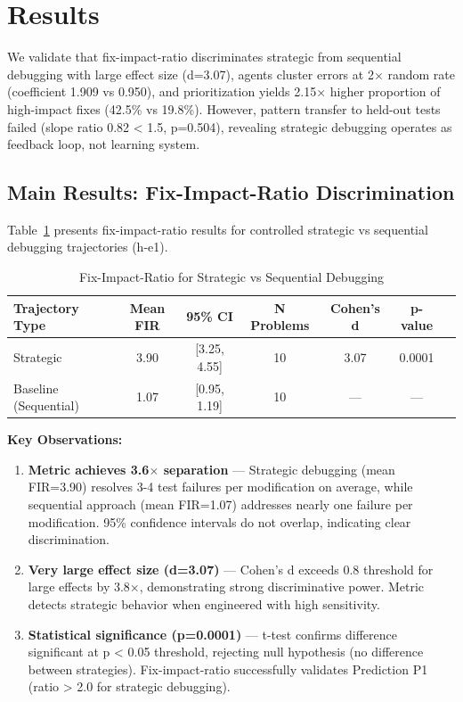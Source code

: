 \section{Results}

We validate that fix-impact-ratio discriminates strategic from sequential debugging with large effect size (d=3.07), agents cluster errors at 2$\times$ random rate (coefficient 1.909 vs 0.950), and prioritization yields 2.15$\times$ higher proportion of high-impact fixes (42.5\% vs 19.8\%). However, pattern transfer to held-out tests failed (slope ratio 0.82 < 1.5, p=0.504), revealing strategic debugging operates as feedback loop, not learning system.

\subsection{Main Results: Fix-Impact-Ratio Discrimination}

Table~\ref{tab:fix_impact} presents fix-impact-ratio results for controlled strategic vs sequential debugging trajectories (h-e1).

\begin{table}[h]
\centering
\caption{Fix-Impact-Ratio for Strategic vs Sequential Debugging}
\label{tab:fix_impact}
\begin{tabular}{lcccccc}
\toprule
Trajectory Type & Mean FIR & 95\% CI & N Problems & Cohen's d & p-value \\
\midrule
Strategic & 3.90 & [3.25, 4.55] & 10 & 3.07 & 0.0001 \\
Baseline (Sequential) & 1.07 & [0.95, 1.19] & 10 & — & — \\
\bottomrule
\end{tabular}
\end{table}

\textbf{Key Observations:}

\begin{enumerate}
\item \textbf{Metric achieves 3.6$\times$ separation} — Strategic debugging (mean FIR=3.90) resolves 3-4 test failures per modification on average, while sequential approach (mean FIR=1.07) addresses nearly one failure per modification. 95\% confidence intervals do not overlap, indicating clear discrimination.

\item \textbf{Very large effect size (d=3.07)} — Cohen's d exceeds 0.8 threshold for large effects by 3.8$\times$, demonstrating strong discriminative power. Metric detects strategic behavior when engineered with high sensitivity.

\item \textbf{Statistical significance (p=0.0001)} — t-test confirms difference significant at p < 0.05 threshold, rejecting null hypothesis (no difference between strategies). Fix-impact-ratio successfully validates Prediction P1 (ratio > 2.0 for strategic debugging).
\end{enumerate}

